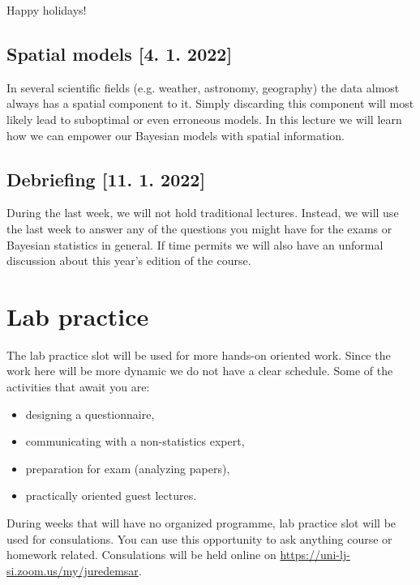 \documentclass[fleqn,moreauthors,10pt]{ds_report}
\begin{document}
Happy holidays!

\subsection*{Spatial models [4. 1. 2022]}

In several scientific fields (e.g. weather, astronomy, geography) the data almost always has a spatial component to it. Simply discarding this component will most likely lead to suboptimal or even erroneous models. In this lecture we will learn how we can empower our Bayesian models with spatial information.

\subsection*{Debriefing [11. 1. 2022]}

During the last week, we will not hold traditional lectures. Instead, we will use the last week to answer any of the questions you might have for the exams or Bayesian statistics in general. If time permits we will also have an unformal discussion about this year's edition of the course.

\section*{Lab practice}

The lab practice slot will be used for more hands-on oriented work. Since the work here will be more dynamic we do not have a clear schedule. Some of the activities that await you are:

\begin{itemize}
	\item designing a questionnaire,
	\item communicating with a non-statistics expert,
	\item preparation for exam (analyzing papers),
	\item practically oriented guest lectures.
\end{itemize}

During weeks that will have no organized programme, lab practice slot will be used for consulations. You can use this opportunity to ask anything course or homework related. Consulations will be held online on \url{https://uni-lj-si.zoom.us/my/juredemsar}.
\end{document}
